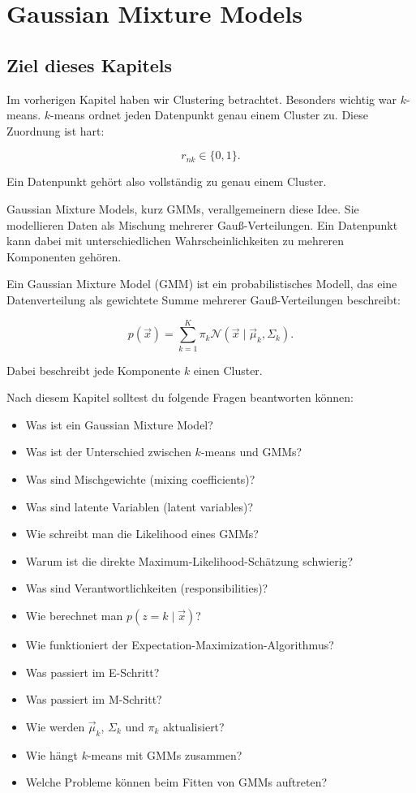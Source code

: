 \chapter{Gaussian Mixture Models}

\section{Ziel dieses Kapitels}

Im vorherigen Kapitel haben wir Clustering betrachtet.
Besonders wichtig war \(k\)-means.
\(k\)-means ordnet jeden Datenpunkt genau einem Cluster zu.
Diese Zuordnung ist hart:

\[
    r_{nk}\in\{0,1\}.
\]

Ein Datenpunkt gehört also vollständig zu genau einem Cluster.

Gaussian Mixture Models, kurz GMMs, verallgemeinern diese Idee.
Sie modellieren Daten als Mischung mehrerer Gauß-Verteilungen.
Ein Datenpunkt kann dabei mit unterschiedlichen Wahrscheinlichkeiten zu mehreren Komponenten gehören.

\begin{conceptbox}
Ein Gaussian Mixture Model (GMM) ist ein probabilistisches Modell, das eine Datenverteilung als gewichtete Summe mehrerer Gauß-Verteilungen beschreibt:

\[
    p(\vec{x})
    =
    \sum_{k=1}^{K}
    \pi_k
    \mathcal{N}(\vec{x}\mid\vec{\mu}_k,\Sigma_k).
\]

Dabei beschreibt jede Komponente \(k\) einen Cluster.
\end{conceptbox}

Nach diesem Kapitel solltest du folgende Fragen beantworten können:

\begin{itemize}
    \item Was ist ein Gaussian Mixture Model?
    \item Was ist der Unterschied zwischen \(k\)-means und GMMs?
    \item Was sind Mischgewichte (mixing coefficients)?
    \item Was sind latente Variablen (latent variables)?
    \item Wie schreibt man die Likelihood eines GMMs?
    \item Warum ist die direkte Maximum-Likelihood-Schätzung schwierig?
    \item Was sind Verantwortlichkeiten (responsibilities)?
    \item Wie berechnet man \(p(z=k\mid\vec{x})\)?
    \item Wie funktioniert der Expectation-Maximization-Algorithmus?
    \item Was passiert im E-Schritt?
    \item Was passiert im M-Schritt?
    \item Wie werden \(\vec{\mu}_k\), \(\Sigma_k\) und \(\pi_k\) aktualisiert?
    \item Wie hängt \(k\)-means mit GMMs zusammen?
    \item Welche Probleme können beim Fitten von GMMs auftreten?
\end{itemize}

